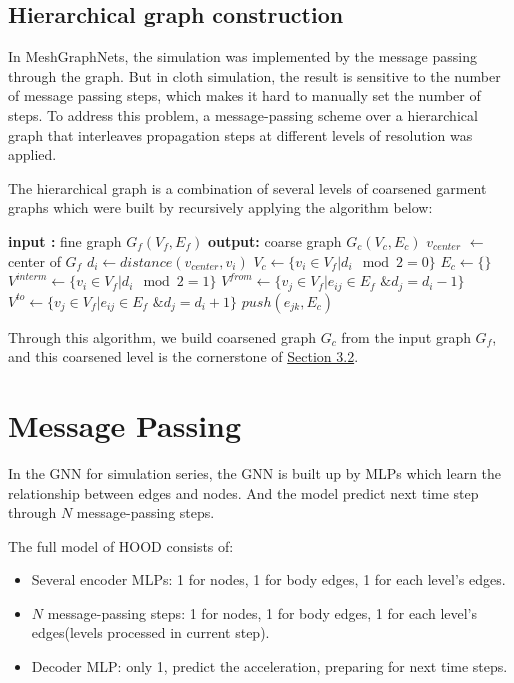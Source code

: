 \documentclass{article}
\begin{document}
\subsection{Hierarchical graph construction}
\par In MeshGraphNets\cite{pfaff2021learning}, the simulation was implemented by the message passing through the graph. But in cloth simulation, the result is sensitive to the number of message passing steps, which makes it hard to manually set the number of steps. To address this problem, a message-passing scheme over a hierarchical graph that interleaves propagation steps at different levels of resolution was applied.
\par The hierarchical graph is a combination of several levels of coarsened garment graphs which were built by recursively applying the algorithm below:
\newpage
\begin{algorithmic}[1]
    \State \textbf{input :} fine graph $G_f(V_f,E_f)$
    \State \textbf{output:} coarse graph $G_c(V_c,E_c)$
    \State $v_{center}$ $\gets$ center of $G_f$
        \State $d_i \gets distance(v_{center}, v_i)$
    \EndFor
    \State $V_c \gets \{v_i \in V_f | d_i \mod 2 = 0\}$
    \State $E_c \gets \{\}$
    \State $V^{interm} \gets \{v_i \in V_f | d_i \mod 2 = 1\}$
        \State $V^{from} \gets \{v_j \in V_f | e_{ij} \in E_f \text{ \& } d_j = d_i - 1\}$
        \State $V^{to} \gets \{v_j \in V_f | e_{ij} \in E_f \text{ \& } d_j = d_i + 1\}$
                \State $push(e_{jk}, E_c)$
            \EndFor
        \EndFor
    \EndFor
\end{algorithmic}
\par Through this algorithm, we build coarsened graph $G_c$ from the input graph $G_f$, and this coarsened level is the cornerstone of \href{subsection.3.2}{Section 3.2}.
\section{Message Passing}
\par In the GNN for simulation series, the GNN is built up by MLPs which learn the relationship between edges and nodes. And the model predict next time step through $N$ message-passing steps.
\par The full model of HOOD consists of:
\begin{itemize}
    \item Several encoder MLPs: 1 for nodes, 1 for body edges, 1 for each level's edges.
    \item $N$ message-passing steps: 1 for nodes, 1 for body edges, 1 for each level's edges(levels processed in current step).
    \item Decoder MLP: only 1, predict the acceleration, preparing for next time steps.
\end{itemize}
\end{document}
